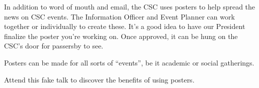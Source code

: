 \documentclass{article}
\begin{document}


In addition to word of mouth and email, the CSC uses posters to help spread the
news on CSC events. The Information Officer and Event Planner can work together
or individually to create these. It's a good idea to have our President
finalize the poster you're working on. Once approved, it can be hung on the
CSC's door for passersby to see.

Posters can be made for all sorts of ``events'', be it academic or social
gatherings.

Attend this fake talk to discover the benefits of using posters.

\end{document}
